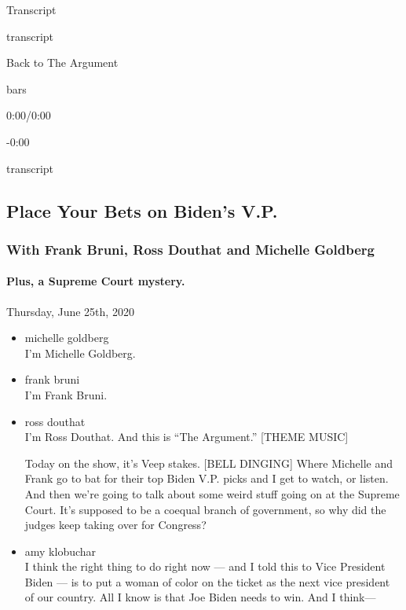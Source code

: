 Transcript

transcript

Back to The Argument

bars

0:00/0:00

-0:00

transcript

\hypertarget{place-your-bets-on-bidens-vp-2}{%
\subsection{Place Your Bets on Biden's
V.P.}\label{place-your-bets-on-bidens-vp-2}}

\hypertarget{with-frank-bruni-ross-douthat-and-michelle-goldberg-1}{%
\subsubsection{With Frank Bruni, Ross Douthat and Michelle
Goldberg}\label{with-frank-bruni-ross-douthat-and-michelle-goldberg-1}}

\hypertarget{plus-a-supreme-court-mystery-2}{%
\paragraph{Plus, a Supreme Court
mystery.}\label{plus-a-supreme-court-mystery-2}}

Thursday, June 25th, 2020

\begin{itemize}
\item
  michelle goldberg\\
  I'm Michelle Goldberg.
\item
  frank bruni\\
  I'm Frank Bruni.
\item
  ross douthat\\
  I'm Ross Douthat. And this is ``The Argument.'' {[}THEME MUSIC{]}

  Today on the show, it's Veep stakes. {[}BELL DINGING{]} Where Michelle
  and Frank go to bat for their top Biden V.P. picks and I get to watch,
  or listen. And then we're going to talk about some weird stuff going
  on at the Supreme Court. It's supposed to be a coequal branch of
  government, so why did the judges keep taking over for Congress?
\item
  amy klobuchar\\
  I think the right thing to do right now --- and I told this to Vice
  President Biden --- is to put a woman of color on the ticket as the
  next vice president of our country. All I know is that Joe Biden needs
  to win. And I think---
\end{itemize}

